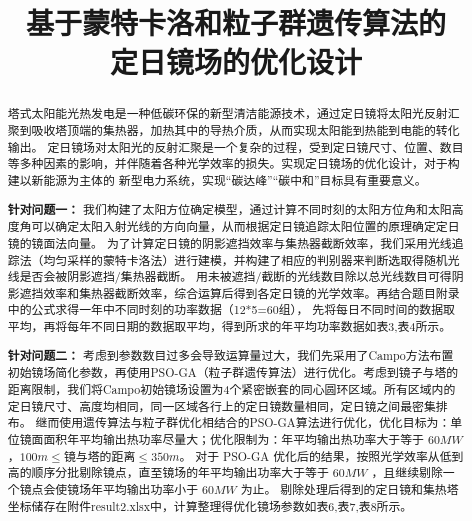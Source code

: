 \documentclass{article}
\date{}
\title{\heiti 基于蒙特卡洛和粒子群遗传算法的\\定日镜场的优化设计}
\numberwithin{equation}{subsection}
\begin{document}
\maketitle
\vspace{-5em}%

\begin{abstract}
塔式太阳能光热发电是一种低碳环保的新型清洁能源技术，通过定日镜将太阳光反射汇聚到吸收塔顶端的集热器，加热其中的导热介质，从而实现太阳能到热能到电能的转化输出。
定日镜场对太阳光的反射汇聚是一个复杂的过程，受到定日镜尺寸、位置、数目等多种因素的影响，并伴随着各种光学效率的损失。实现定日镜场的优化设计，对于构建以新能源为主体的
新型电力系统，实现“碳达峰”“碳中和”目标具有重要意义。 

\textbf{针对问题一：}
我们构建了太阳方位确定模型，通过计算不同时刻的太阳方位角和太阳高度角可以确定太阳入射光线的方向向量，从而根据定日镜追踪太阳位置的原理确定定日镜的镜面法向量。
为了计算定日镜的阴影遮挡效率与集热器截断效率，我们采用光线追踪法（均匀采样的蒙特卡洛法）进行建模，并构建了相应的判别器来判断选取得随机光线是否会被阴影遮挡/集热器截断。
用未被遮挡/截断的光线数目除以总光线数目可得阴影遮挡效率和集热器截断效率，综合运算后得到各定日镜的光学效率。再结合题目附录中的公式求得一年中不同时刻的功率数据（12*5=60组），
先将每日不同时间的数据取平均，再将每年不同日期的数据取平均，得到所求的年平均功率数据如表3,表4所示。


\textbf{针对问题二：}
考虑到参数数目过多会导致运算量过大，我们先采用了Campo方法布置初始镜场简化参数，再使用PSO-GA（粒子群遗传算法）进行优化。考虑到镜子与塔的距离限制，我们将Campo初始镜场设置为4个紧密嵌套的同心圆环区域。所有区域内的定日镜尺寸、高度均相同，同一区域各行上的定日镜数量相同，定日镜之间最密集排布。
继而使用遗传算法与粒子群优化相结合的PSO-GA算法进行优化，优化目标为：单位镜面面积年平均输出热功率尽量大；优化限制为：年平均输出热功率大于等于 $ 60 MW$，$100m\leq$镜与塔的距离$\leq 350m$。
对于 PSO-GA 优化后的结果，按照光学效率从低到高的顺序分批剔除镜点，直至镜场的年平均输出功率大于等于 $60M W$ ，且继续剔除一个镜点会使镜场年平均输出功率小于 $60M W$ 为止。
剔除处理后得到的定日镜和集热塔坐标储存在附件result2.xlsx中，计算整理得优化镜场参数如表6,表7,表8所示。



\end{abstract}
\end{document}
